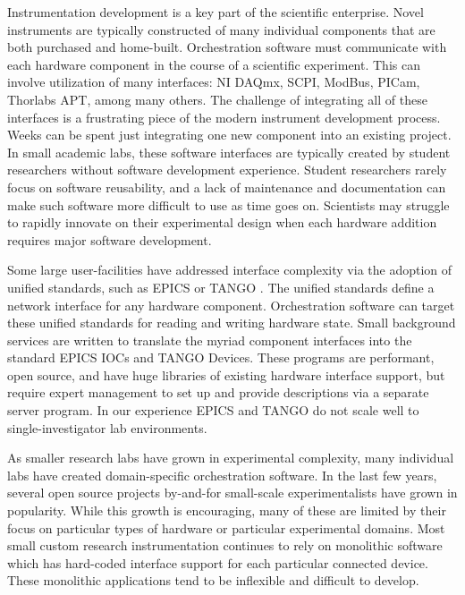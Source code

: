 \documentclass[aip, amsmath, amssymb, reprint,]{revtex4-2}
\begin{document}
Instrumentation development is a key part of the scientific enterprise.
Novel instruments are typically constructed of many individual components that are both purchased and home-built.
Orchestration software must communicate with each hardware component in the course of a scientific experiment.
This can involve utilization of many interfaces: NI DAQmx\cite{nidaqmx}, SCPI\cite{scpi}, ModBus\cite{modbus}, PICam\cite{picam}, Thorlabs APT\cite{thorlabs_apt}, among many others.
The challenge of integrating all of these interfaces is a frustrating piece of the modern instrument development process.
Weeks can be spent just integrating one new component into an existing project.
In small academic labs, these software interfaces are typically created by student researchers without software development experience.
Student researchers rarely focus on software reusability, and a lack of maintenance and documentation can make such software more difficult to use as time goes on.
Scientists may struggle to rapidly innovate on their experimental design when each hardware addition requires major software development.

Some large user-facilities have addressed interface complexity via the adoption of unified standards, such as EPICS \cite{DalesioLR1991a} or TANGO \cite{AGotz1999TANGOA}.
The unified standards define a network interface for any hardware component.
Orchestration software can target these unified standards for reading and writing hardware state.
Small background services are written to translate the myriad component interfaces into the standard EPICS IOCs and TANGO Devices.
These programs are performant, open source, and have huge libraries of existing hardware interface support, but require expert management to set up and provide descriptions via a separate server program.
In our experience EPICS and TANGO do not scale well to single-investigator lab environments.

As smaller research labs have grown in experimental complexity, many individual labs have created domain-specific orchestration software.
In the last few years, several open source projects by-and-for small-scale experimentalists have grown in popularity\cite{WeberSebastien2021a,Bogdanowicz2022,trspectrometer,Koerner_2019,Campagnola_2014,pymeasure,Giesbrecht_2022,pylablib}.
While this growth is encouraging, many of these are limited by their focus on particular types of hardware or particular experimental domains.
Most small custom research instrumentation continues to rely on monolithic software which has hard-coded interface support for each particular connected device.
These monolithic applications tend to be inflexible and difficult to develop.
\end{document}
